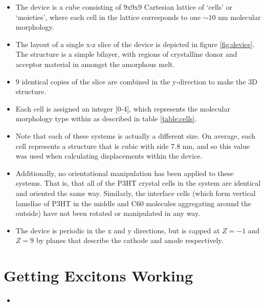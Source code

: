 \documentclass[12pt]{article}
\begin{document}
\begin{itemize}
    \item{The device is a cube consisting of 9x9x9 Cartesian lattice of `cells' or `moieties', where each cell in the lattice corresponds to one $\sim 10$ nm molecular morphology.}
    \item{The layout of a single x-z slice of the device is depicted in figure \ref{fig:device}. The structure is a simple bilayer, with regions of crystalline donor and acceptor material in amongst the amorphous melt.}
    \item{9 identical copies of the slice are combined in the y-direction to make the 3D structure.}
    \item{Each cell is assigned an integer [0-4], which represents the molecular morphology type within as described in table \ref{table:cells}.}
    \item{Note that each of these systems is actually a different size. On average, each cell represents a structure that is cubic with side 7.8 nm, and so this value was used when calculating displacements within the device.}
    \item{Additionally, no orientational manipulation has been applied to these systems. That is, that all of the P3HT crystal cells in the system are identical and oriented the same way. Similarly, the interface cells (which form vertical lamellae of P3HT in the middle and C60 molecules aggregating around the outside) have not been rotated or manipulated in any way.}
    \item{The device is periodic in the x and y directions, but is capped at $Z = -1$ and $Z = 9$ by planes that describe the cathode and anode respectively.} 
\end{itemize}



\section{Getting Excitons Working}

\begin{itemize}
    \item{}
\end{itemize}




\end{document}
